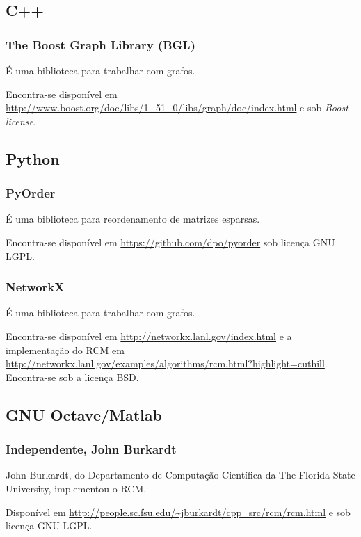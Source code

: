 \subsection{C++}
\subsubsection{The Boost Graph Library (BGL)}
É uma biblioteca para trabalhar com grafos.

Encontra-se disponível em
\url{http://www.boost.org/doc/libs/1_51_0/libs/graph/doc/index.html} e sob
\textit{Boost license}.

\subsection{Python}
\subsubsection{PyOrder}
É uma biblioteca para reordenamento de matrizes esparsas.

Encontra-se disponível em \url{https://github.com/dpo/pyorder} sob licença GNU
LGPL.

\subsubsection{NetworkX}
É uma biblioteca para trabalhar com grafos.

Encontra-se disponível em \url{http://networkx.lanl.gov/index.html} e a
implementação do RCM em
\url{http://networkx.lanl.gov/examples/algorithms/rcm.html?highlight=cuthill}.
Encontra-se sob a licença BSD.

\subsection{GNU Octave/Matlab}
\subsubsection{Independente, John Burkardt}
John Burkardt, do Departamento de Computação Científica da The Florida State
University, implementou o RCM.

Disponível em \url{http://people.sc.fsu.edu/~jburkardt/cpp_src/rcm/rcm.html} e
sob licença GNU LGPL.
